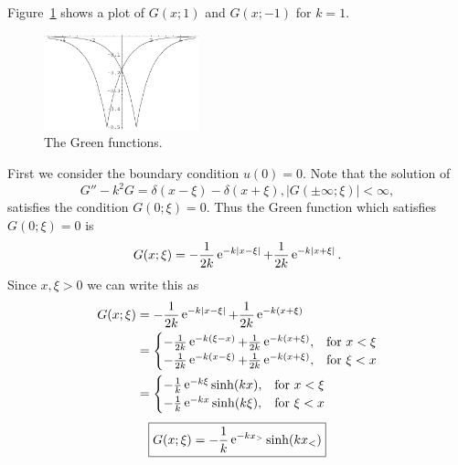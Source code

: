{%
\begin{Solution}
  \label{solution u-k2u=f}
  Figure~\ref{helmholtz1am1} shows a plot of $G(x;1)$ and $G(x;-1)$ for $k=1$.

  \begin{figure}[tb!]
    \begin{center}
      \includegraphics[width=0.4\textwidth]{ode/inhomogeneous/helmholtz1am1}
    \end{center}
    \caption{The Green functions.}
    \label{helmholtz1am1}
  \end{figure}

  First we consider the boundary condition $u(0) = 0$.  Note that the solution of
  \[
  G'' - k^2 G = \delta(x - \xi) - \delta(x+\xi), |G(\pm\infty;\xi)| < \infty,
  \]
  satisfies the condition $G(0;\xi) = 0$.  Thus the Green function which 
  satisfies $G(0;\xi) = 0$ is
  \[
  G(x;\xi) = - \frac{1}{2k} \mathop{\mathrm{e}}\nolimits^{-k |x-\xi|} + \frac{1}{2k} \mathop{\mathrm{e}}\nolimits^{-k |x+\xi|}.
  \]
  Since $x,\xi > 0$ we can write this as
  \begin{align*}
    G(x;\xi) &= - \frac{1}{2k} \mathop{\mathrm{e}}\nolimits^{-k |x-\xi|} + \frac{1}{2k} \mathop{\mathrm{e}}\nolimits^{-k (x+\xi)} \\
    &= \begin{cases}
      - \frac{1}{2k} \mathop{\mathrm{e}}\nolimits^{-k (\xi-x)} + \frac{1}{2k} \mathop{\mathrm{e}}\nolimits^{-k (x+\xi)},
      &\mathrm{for}\ x < \xi \\
      - \frac{1}{2k} \mathop{\mathrm{e}}\nolimits^{-k (x-\xi)} + \frac{1}{2k} \mathop{\mathrm{e}}\nolimits^{-k (x+\xi)},
      &\mathrm{for}\ \xi < x 
    \end{cases} \\
    &= \begin{cases}
      - \frac{1}{k} \mathop{\mathrm{e}}\nolimits^{-k \xi} \sinh(k x), &\mathrm{for}\ x < \xi \\
      - \frac{1}{k} \mathop{\mathrm{e}}\nolimits^{-k x} \sinh(k \xi), &\mathrm{for}\ \xi < x 
    \end{cases} \\
  \end{align*}
  \[
  \boxed{
    G(x;\xi) = - \frac{1}{k} \mathop{\mathrm{e}}\nolimits^{-k x_>} \sinh(k x_<)
    }
  \]


\end{Solution}}
